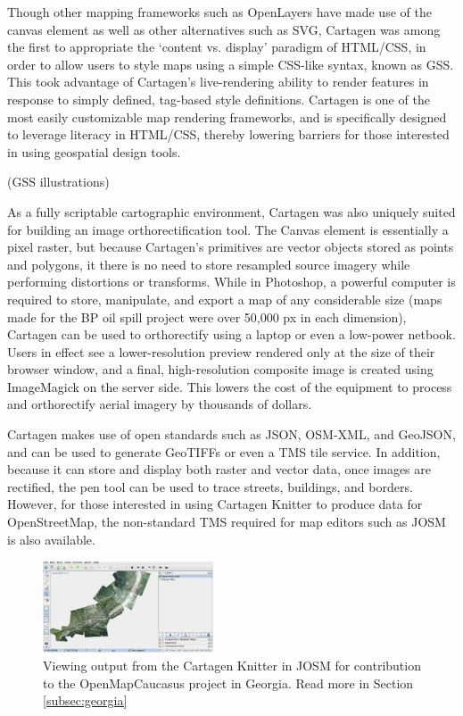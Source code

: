 \documentclass[11pt,oneside,notitlepage]{report}
\begin{document}
Though other mapping frameworks such as OpenLayers have made use of the canvas element as well as other alternatives such as \ac{SVG}, Cartagen was among the first to appropriate the `content vs. display' paradigm of HTML/CSS, in order to allow users to style maps using a simple CSS-like syntax, known as \ac{GSS}. This took advantage of Cartagen's live-rendering ability to render features in response to simply defined, tag-based style definitions. Cartagen is one of the most easily customizable map rendering frameworks, and is specifically designed to leverage literacy in HTML/CSS, thereby lowering barriers for those interested in using geospatial design tools. 

(GSS illustrations)

As a fully scriptable cartographic environment, Cartagen was also uniquely suited for building an image orthorectification tool. The Canvas element is essentially a pixel raster, but because Cartagen's primitives are vector objects stored as points and polygons, it there is no need to store resampled source imagery while performing distortions or transforms. While in Photoshop, a powerful computer is required to store, manipulate, and export a map of any considerable size (maps made for the BP oil spill project were over 50,000 px in each dimension), Cartagen can be used to orthorectify using a laptop or even a low-power netbook. Users in effect see a lower-resolution preview rendered only at the size of their browser window, and a final, high-resolution composite image is created using ImageMagick on the server side. This lowers the cost of the equipment to process and orthorectify aerial imagery by thousands of dollars. 

Cartagen makes use of open standards such as JSON, OSM-XML, and GeoJSON, and can be used to generate \ac{GeoTIFF}s or even a \ac{TMS} tile service. In addition, because it can store and display both raster and vector data, once images are rectified, the pen tool can be used to trace streets, buildings, and borders. However, for those interested in using Cartagen Knitter to produce data for OpenStreetMap, the non-standard TMS required for map editors such as JOSM is also available.

\begin{figure}
	\begin{flushright}
		\includegraphics[width=0.45\textwidth]{images/knitter-josm.png}
		\caption{Viewing output from the Cartagen Knitter in \ac{JOSM} for contribution to the OpenMapCaucasus project in Georgia. Read more in Section \ref{subsec:georgia}}
	\end{flushright}
\end{figure}
\end{document}

